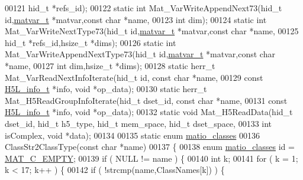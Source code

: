 \begin{DoxyCode}
00121                    hid\_t *refs\_id);
00122 \textcolor{keyword}{static} \textcolor{keywordtype}{int}     Mat\_VarWriteAppendNext73(hid\_t \textcolor{keywordtype}{id},\hyperlink{group___m_a_t_structmatvar__t}{matvar\_t} *matvar,\textcolor{keyword}{const} \textcolor{keywordtype}{char} *name,
00123                    \textcolor{keywordtype}{int} dim);
00124 \textcolor{keyword}{static} \textcolor{keywordtype}{int}     Mat\_VarWriteNextType73(hid\_t \textcolor{keywordtype}{id},\hyperlink{group___m_a_t_structmatvar__t}{matvar\_t} *matvar,\textcolor{keyword}{const} \textcolor{keywordtype}{char} *name,
00125                    hid\_t *refs\_id,hsize\_t *dims);
00126 \textcolor{keyword}{static} \textcolor{keywordtype}{int}     Mat\_VarWriteAppendNextType73(hid\_t \textcolor{keywordtype}{id},\hyperlink{group___m_a_t_structmatvar__t}{matvar\_t} *matvar,\textcolor{keyword}{const} \textcolor{keywordtype}{char} *name,
00127                    \textcolor{keywordtype}{int} dim,hsize\_t *dims);
00128 \textcolor{keyword}{static} herr\_t  Mat\_VarReadNextInfoIterate(hid\_t \textcolor{keywordtype}{id}, \textcolor{keyword}{const} \textcolor{keywordtype}{char} *name,
00129                    \textcolor{keyword}{const} \hyperlink{struct_h5_l__info__t}{H5L\_info\_t} *info, \textcolor{keywordtype}{void} *op\_data);
00130 \textcolor{keyword}{static} herr\_t  Mat\_H5ReadGroupInfoIterate(hid\_t dset\_id, \textcolor{keyword}{const} \textcolor{keywordtype}{char} *name,
00131                    \textcolor{keyword}{const} \hyperlink{struct_h5_l__info__t}{H5L\_info\_t} *info, \textcolor{keywordtype}{void} *op\_data);
00132 \textcolor{keyword}{static} \textcolor{keywordtype}{void}    Mat\_H5ReadData(hid\_t dset\_id, hid\_t h5\_type, hid\_t mem\_space, hid\_t dset\_space,
00133                    \textcolor{keywordtype}{int} isComplex, \textcolor{keywordtype}{void} *data);
00134 
00135 \textcolor{keyword}{static} \textcolor{keyword}{enum} \hyperlink{group___m_a_t_gad4d60ae7b709fc81bfd744fb4c857c40}{matio\_classes}
00136 ClassStr2ClassType(\textcolor{keyword}{const} \textcolor{keywordtype}{char} *name)
00137 \{
00138     \textcolor{keyword}{enum} \hyperlink{group___m_a_t_gad4d60ae7b709fc81bfd744fb4c857c40}{matio\_classes} \textcolor{keywordtype}{id} = \hyperlink{group___m_a_t_ggad4d60ae7b709fc81bfd744fb4c857c40a5c76eef0ca0373d25abe49053be6fa9a}{MAT\_C\_EMPTY};
00139     \textcolor{keywordflow}{if} ( NULL != name ) \{
00140         \textcolor{keywordtype}{int} k;
00141         \textcolor{keywordflow}{for} ( k = 1; k < 17; k++ ) \{
00142             \textcolor{keywordflow}{if} ( !strcmp(name,ClassNames[k]) ) \{

\end{DoxyCode}
